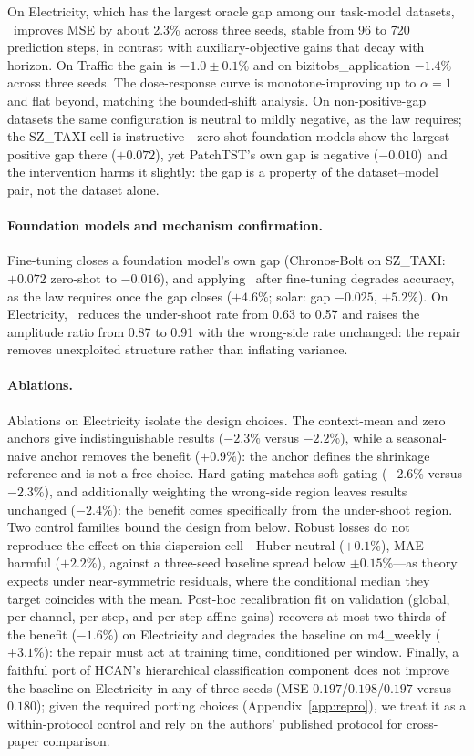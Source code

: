 On Electricity, which has the largest oracle gap among our task-model datasets, \rfc~improves MSE by about 2.3\% across three seeds, stable from 96 to 720 prediction steps, in contrast with auxiliary-objective gains that decay with horizon. On Traffic the gain is $-1.0 \pm 0.1\%$ and on bizitobs\_application $-1.4\%$ across three seeds. The dose-response curve is monotone-improving up to $\alpha{=}1$ and flat beyond, matching the bounded-shift analysis. On non-positive-gap datasets the same configuration is neutral to mildly negative, as the law requires; the SZ\_TAXI cell is instructive---zero-shot foundation models show the largest positive gap there ($+0.072$), yet PatchTST's own gap is negative ($-0.010$) and the intervention harms it slightly: the gap is a property of the dataset--model pair, not the dataset alone.

\paragraph{Foundation models and mechanism confirmation.}
Fine-tuning closes a foundation model's own gap (Chronos-Bolt on SZ\_TAXI: $+0.072$ zero-shot to $-0.016$), and applying \rfc~after fine-tuning degrades accuracy, as the law requires once the gap closes ($+4.6\%$; solar: gap $-0.025$, $+5.2\%$). On Electricity, \rfc~reduces the under-shoot rate from 0.63 to 0.57 and raises the amplitude ratio from 0.87 to 0.91 with the wrong-side rate unchanged: the repair removes unexploited structure rather than inflating variance.

\paragraph{Ablations.}

Ablations on Electricity isolate the design choices. The context-mean and zero anchors give indistinguishable results ($-2.3\%$ versus $-2.2\%$), while a seasonal-naive anchor removes the benefit ($+0.9\%$): the anchor defines the shrinkage reference and is not a free choice. Hard gating matches soft gating ($-2.6\%$ versus $-2.3\%$), and additionally weighting the wrong-side region leaves results unchanged ($-2.4\%$): the benefit comes specifically from the under-shoot region. Two control families bound the design from below. Robust losses do not reproduce the effect on this dispersion cell---Huber neutral ($+0.1\%$), MAE harmful ($+2.2\%$), against a three-seed baseline spread below $\pm 0.15\%$---as theory expects under near-symmetric residuals, where the conditional median they target coincides with the mean. Post-hoc recalibration fit on validation (global, per-channel, per-step, and per-step-affine gains) recovers at most two-thirds of the benefit ($-1.6\%$) on Electricity and degrades the baseline on m4\_weekly ($+3.1\%$): the repair must act at training time, conditioned per window. Finally, a faithful port of HCAN's hierarchical classification component \citep{hcan} does not improve the baseline on Electricity in any of three seeds (MSE $0.197$/$0.198$/$0.197$ versus $0.180$); given the required porting choices (Appendix~\ref{app:repro}), we treat it as a within-protocol control and rely on the authors' published protocol for cross-paper comparison.

